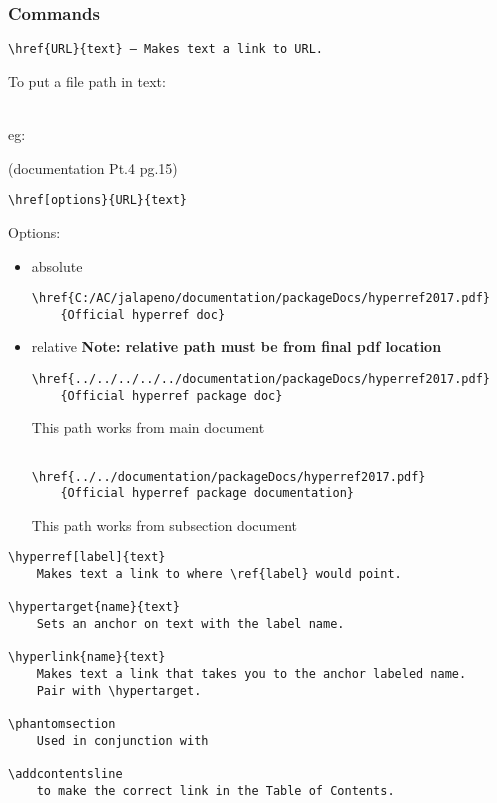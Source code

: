 \documentclass[class=article, crop=false, titlepage, twoside, multi={itemize, figure, verbatim}, float=false]{standalone}
\begin{document}
\subsubsection[Commands]{\Large Commands}
\begin{verbatim}
\href{URL}{text} — Makes text a link to URL.
\end{verbatim}

\begin{Large}To put a file path in text:\end{Large}\\
eg:


\begin{tiny}(documentation Pt.4 pg.15)\end{tiny}
\begin{verbatim}
\href[options}{URL}{text}
\end{verbatim}

Options:\begin{itemize}
\item absolute
\begin{footnotesize}
\begin{verbatim}
\href{C:/AC/jalapeno/documentation/packageDocs/hyperref2017.pdf}
    {Official hyperref doc}
\end{verbatim}
\end{footnotesize}

\item relative \textbf{Note: relative path must be from final pdf location}
\begin{footnotesize}
\begin{verbatim}
\href{../../../../../documentation/packageDocs/hyperref2017.pdf}
    {Official hyperref package doc}
\end{verbatim}
This path works from main document
\begin{verbatim}

\href{../../documentation/packageDocs/hyperref2017.pdf}
    {Official hyperref package documentation}
\end{verbatim}
This path works from subsection document

\end{footnotesize}

\end{itemize}

\begin{verbatim}
\hyperref[label]{text}
    Makes text a link to where \ref{label} would point.

\hypertarget{name}{text}
    Sets an anchor on text with the label name.

\hyperlink{name}{text}
    Makes text a link that takes you to the anchor labeled name.
    Pair with \hypertarget.

\phantomsection
    Used in conjunction with

\addcontentsline
    to make the correct link in the Table of Contents.
\end{verbatim}
\end{document}
